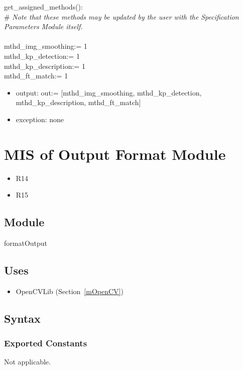 \documentclass[12pt, titlepage]{article}
\begin{document}
\noindent get\_assigned\_methods(): \\
\# \textit{Note that these methods may be updated by the user with the Specification Parameters Module itself.} \\ \\
mthd\_img\_smoothing:= 1 \\
mthd\_kp\_detection:= 1 \\
mthd\_kp\_description:= 1 \\
mthd\_ft\_match:= 1 
\begin{itemize}
\item output: out:= [mthd\_img\_smoothing, mthd\_kp\_detection, mthd\_kp\_description, mthd\_ft\_match]
\item exception: none 
\end{itemize}



\newpage
\section{MIS of Output Format Module} \label{mOF}
\begin{itemize}
  \item R14
  \item R15
\end{itemize}
\subsection{Module}

formatOutput

\subsection{Uses}
\begin{itemize}
  \item OpenCVLib (Section~\ref{mOpenCV})
\end{itemize}

\subsection{Syntax}

\subsubsection{Exported Constants}
Not applicable.
\end{document}
